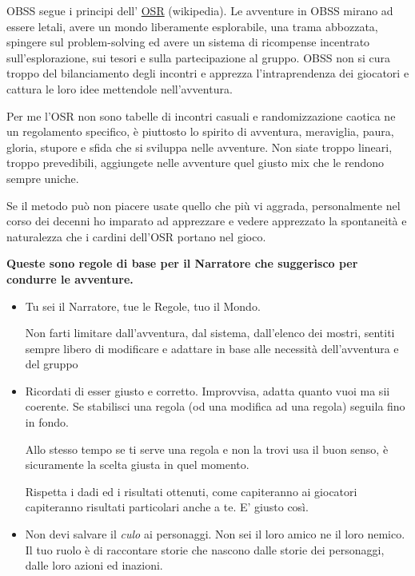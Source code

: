 \begin{multicols}{2}
OBSS segue i principi dell' \href{https://it.wikipedia.org/wiki/Old_School_Renaissance}{OSR} (wikipedia). Le avventure in OBSS mirano ad essere letali, avere un mondo liberamente esplorabile, una trama abbozzata, spingere sul problem-solving ed avere un sistema di ricompense incentrato sull'esplorazione, sui tesori e sulla partecipazione al gruppo. OBSS non si cura troppo del bilanciamento degli incontri e apprezza l'intraprendenza dei giocatori e cattura le loro idee mettendole nell'avventura.

Per me l'OSR non sono tabelle di incontri casuali e randomizzazione caotica ne un regolamento specifico, è piuttosto lo spirito di avventura, meraviglia, paura, gloria, stupore e sfida che si sviluppa nelle avventure. Non siate troppo lineari, troppo prevedibili, aggiungete nelle avventure quel giusto mix che le rendono sempre uniche.

Se il metodo può non piacere usate quello che più vi aggrada, personalmente nel corso dei decenni ho imparato ad apprezzare e vedere apprezzato la spontaneità e naturalezza che i cardini dell'OSR portano nel gioco.

\bigskip

\textbf{Queste sono regole di base per il Narratore che suggerisco per condurre le avventure.}

\medskip

\begin{itemize}[leftmargin=*] \setlength{\itemsep}{0pt}

\item
Tu sei il Narratore, tue le Regole, tuo il Mondo.

Non farti limitare dall'avventura, dal sistema, dall'elenco dei mostri, sentiti sempre libero di modificare e adattare in base alle necessità dell'avventura e del gruppo

\item
Ricordati di esser giusto e corretto. Improvvisa, adatta quanto vuoi ma sii coerente. Se stabilisci una regola (od una modifica ad una regola) seguila fino in fondo.

Allo stesso tempo se ti serve una regola e non la trovi usa il buon senso, è sicuramente la scelta giusta in quel momento.

Rispetta i dadi ed i risultati ottenuti, come capiteranno ai giocatori capiteranno risultati particolari anche a te. E' giusto così.

\item
Non devi salvare il \emph{culo} ai personaggi. Non sei il loro amico ne il loro nemico. Il tuo ruolo è di raccontare storie che nascono dalle storie dei personaggi, dalle loro azioni ed inazioni.


\end{itemize}
\end{multicols}
